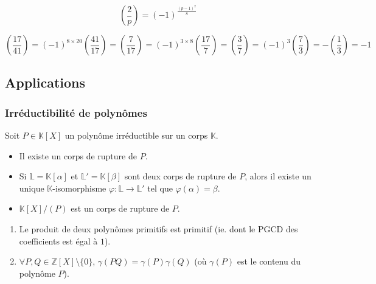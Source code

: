   \begin{proposition}
    \[ \left( \frac{2}{p} \right) = (-1)^{\frac{(p-1)^2}{8}} \]
  \end{proposition}

  \begin{example}
    \[ \left( \frac{17}{41} \right) = (-1)^{8 \times 20} \left( \frac{41}{17} \right) = \left( \frac{7}{17} \right) = (-1)^{3 \times 8} \left( \frac{17}{7} \right) = \left( \frac{3}{7} \right) = (-1)^{3} \left( \frac{7}{3} \right) = - \left( \frac{1}{3} \right) = -1 \]
  \end{example}

  \subsection{Applications}

  \subsubsection{Irréductibilité de polynômes}


  \begin{theorem}
    Soit $P \in \mathbb{K}[X]$ un polynôme irréductible sur un corps $\mathbb{K}$.
    \begin{itemize}
      \item Il existe un corps de rupture de $P$.
      \item Si $\mathbb{L} = \mathbb{K}[\alpha]$ et $\mathbb{L}' = \mathbb{K}[\beta]$ sont deux corps de rupture de $P$, alors il existe un unique $\mathbb{K}$-isomorphisme $\varphi : \mathbb{L} \rightarrow \mathbb{L}'$ tel que $\varphi(\alpha) = \beta$.
      \item $\mathbb{K}[X]/(P)$ est un corps de rupture de $P$.
    \end{itemize}
  \end{theorem}


  \begin{lemma}
    \begin{enumerate}[label={\bfseries(\roman*)}]
      \item Le produit de deux polynômes primitifs est primitif (ie. dont le PGCD des coefficients est égal à $1$).
      \item $\forall P, Q \in \mathbb{Z}[X] \setminus \{ 0 \}$, $\gamma(PQ) = \gamma(P) \gamma(Q)$ (où $\gamma(P)$ est le contenu du polynôme $P$).
    \end{enumerate}
  \end{lemma}

